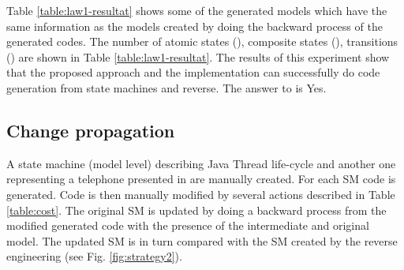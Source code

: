  

Table \ref{table:law1-resultat} shows some of the generated models which have the same information as the models created by doing the backward process of the generated codes. The number of atomic states (), composite states (), transitions () are shown in Table \ref{table:law1-resultat}. The results of this experiment show that the proposed approach and the implementation can successfully do code generation from state machines and reverse. The answer to  is Yes. 

\subsection{Change propagation} 
A state machine (model level) describing Java Thread life-cycle \cite{_java_thread} and another one representing a telephone presented in \cite{Specification2007} are manually created. For each SM code is generated. Code is then manually modified by several actions described in Table \ref{table:cost}. The original SM is updated by doing a backward process from the modified generated code with the presence of the intermediate and original model. The updated SM is in turn compared with the SM created by the reverse engineering (see Fig. \ref{fig:strategy2}). 

